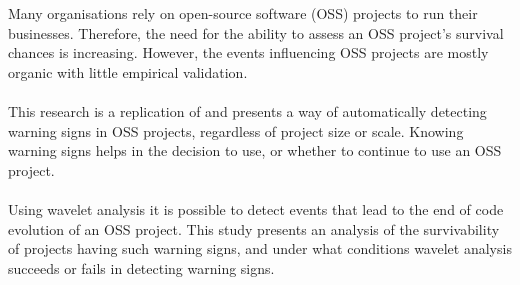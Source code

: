 Many organisations rely on open-source software (OSS) projects to run their
businesses. Therefore, the need for the ability to assess an OSS project's
survival chances is increasing. However, the events influencing OSS projects
are mostly organic with little empirical validation.

\paragraph{}
This research is a replication of \textit{\repltitle} and presents a way
of automatically detecting warning signs in OSS projects, regardless of project
size or scale. Knowing warning signs helps in the decision to use, or whether
to continue to use an OSS project.

\paragraph{}
Using wavelet analysis it is possible to detect events that lead to the end of
code evolution of an OSS project. This study presents an analysis of the
survivability of projects having such warning signs, and under what conditions
wavelet analysis succeeds or fails in detecting warning signs.


\begin{comment}
1. State the problem.
2. State why the problem is a problem.
3. Startling.
4. State the implication of the startling.

See:
Ralph E. Johnson, Kent Beck, Grady Booch, William R. Cook, Richard P. Gabriel,
and Rebecca Wirfs-Brock.
How to Get a Paper Accepted at OOPSLA.
In Timlynn Babitsky and Jim Salmons, editors,
Proceedings of the Eighth Annual Conference on Object-Oriented Programming Systems, Languages and Applications, OOPSLA,
pages 429–436. ACM, 1993.
\end{comment}
